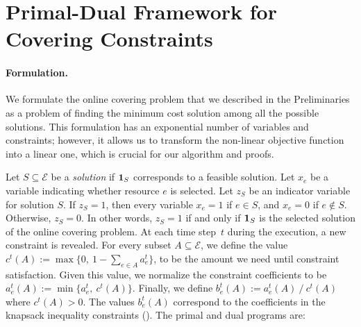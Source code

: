 
\section{Primal-Dual Framework for  Covering Constraints}		\label{sec:covering}

\paragraph{Formulation.}
We formulate the online covering problem that we described in the Preliminaries as a problem of finding the minimum cost solution among all the possible solutions. This formulation has an exponential number of variables and constraints; however, it allows us to transform the non-linear objective function into a linear one, which is crucial for our algorithm and proofs.

Let $S \subseteq \mathcal{E}$ be a \emph{solution} if $\mathbf{1}_{S}$ corresponds to a feasible solution. Let $x_{e}$ be a variable indicating whether resource $e$ is selected.
Let $z_{S}$ be an indicator variable for solution $S$. If $z_{S} = 1$, then every variable
$x_{e} = 1$ if $e \in S$, and $x_{e} = 0$ if $e \notin S$. Otherwise, $z_S = 0$. In other words, $z_{S} = 1$ if and only if $\mathbf{1}_{S}$ is the selected solution of the online covering problem. At each time step~$t$ during the execution, a new constraint is revealed. For every subset $A \subseteq \mathcal{E}$, we define the value $c^{t}(A) := \max\{0,\ 1 - \sum_{e \in A} a^{t}_{e}\}$, to be the amount we need until constraint satisfaction. Given this value, we normalize the constraint coefficients to be $a^{t}_{e}(A) := \min\{a_{e}^{t},\ c^{t}(A)\}$. Finally, we define $b^{t}_{e}(A) := a^{t}_{e}(A)\ /\ c^{t}(A)$ where $c^{t}(A) > 0$. The values $b^{t}_{e}(A)$ correspond to the coefficients in the knapsack inequality constraints (\cite{CarrFleischer:2000}). The primal and dual programs are:

